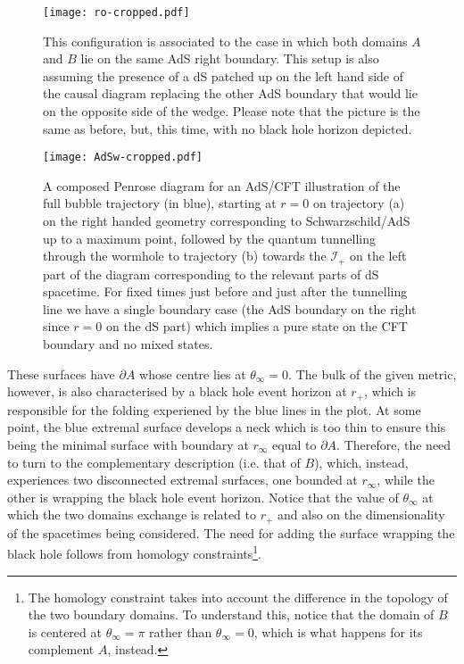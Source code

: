 \documentclass[11pt,a4paper]{article}
\begin{document}
\begin{figure}[h!]
\begin{center} 
\texttt{[image: ro-cropped.pdf]} 
\caption{\footnotesize{This configuration is associated to the case in which both domains $A$ and $B$ lie on the same AdS right boundary. This setup is also assuming the presence of a dS patched up on the left hand side of the causal diagram replacing the other AdS boundary that would lie on the opposite side of the wedge. Please note that the picture is the same as before, but, this time, with no black hole horizon depicted.}} 
\end{center} 
\end{figure} 
\begin{figure}[h!] 
\begin{center}
\texttt{[image: AdSw-cropped.pdf]}
\caption{\footnotesize{A composed Penrose diagram for an AdS/CFT illustration of the full bubble trajectory (in blue), starting at $r=0$ on trajectory (a) on the right handed geometry corresponding to Schwarzschild/AdS up to a maximum point, followed by the quantum tunnelling through the wormhole to trajectory (b) towards the $\mathcal{I}_+$ on the left part of the diagram corresponding to the relevant parts of dS spacetime. For fixed times just before and just after the tunnelling line we have a single boundary case (the AdS boundary on the right since $r=0$ on the dS part) which implies a pure state on the CFT boundary and no mixed states.}} 
\end{center}
\end{figure}

These surfaces have $\partial A$ whose centre lies at $\theta_{\infty}=0$. The bulk of the given metric, however, is also characterised by a black hole event horizon at $r_{+}$, which is responsible for the folding experiened by the blue lines in the plot. At some point, the blue extremal surface develops a neck which is too thin to ensure this being the minimal surface with boundary at $r_{\infty}$ equal to $\partial A$. Therefore, the need to turn to the complementary description (i.e. that of $B$), which, instead, experiences two disconnected extremal surfaces, one bounded at $r_{\infty}$, while the other is wrapping the black hole event horizon. Notice that the value of $\theta_{\infty}$ at which the two domains exchange is related to $r_{+}$ and also on the dimensionality of the spacetimes being considered. The need for adding the surface wrapping the black hole follows from homology constraints\footnote{The homology constraint takes into account the difference in the topology of the two boundary domains. To understand this, notice that the domain of $B$ is centered at $\theta_{\infty}=\pi$ rather than $\theta_{\infty}=0$, which is what happens for its complement $A$, instead.}. 
\end{document}
